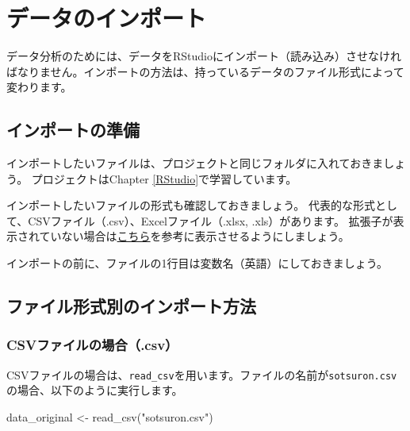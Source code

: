 \documentclass[
]{book}
\newenvironment{Shaded}{\begin{snugshade}}{\end{snugshade}}
\newcommand{\FunctionTok}[1]{\textcolor[rgb]{0.00,0.00,0.00}{#1}}
\newcommand{\NormalTok}[1]{#1}
\newcommand{\OtherTok}[1]{\textcolor[rgb]{0.56,0.35,0.01}{#1}}
\newcommand{\StringTok}[1]{\textcolor[rgb]{0.31,0.60,0.02}{#1}}
\begin{document}
\hypertarget{ImportData}{%
\chapter{データのインポート}\label{ImportData}}

データ分析のためには、データをRStudioにインポート（読み込み）させなければなりません。インポートの方法は、持っているデータのファイル形式によって変わります。

\hypertarget{ux30a4ux30f3ux30ddux30fcux30c8ux306eux6e96ux5099}{%
\section{インポートの準備}\label{ux30a4ux30f3ux30ddux30fcux30c8ux306eux6e96ux5099}}

インポートしたいファイルは、プロジェクトと同じフォルダに入れておきましょう。
プロジェクトはChapter \ref{RStudio}で学習しています。

インポートしたいファイルの形式も確認しておきましょう。
代表的な形式として、CSVファイル（.csv）、Excelファイル（.xlsx, .xls）があります。
拡張子が表示されていない場合は\href{https://pc-karuma.net/windows-10-show-explorer-file-name-extension/}{こちら}を参考に表示させるようにしましょう。

インポートの前に、ファイルの1行目は変数名（英語）にしておきましょう。

\hypertarget{ux30d5ux30a1ux30a4ux30ebux5f62ux5f0fux5225ux306eux30a4ux30f3ux30ddux30fcux30c8ux65b9ux6cd5}{%
\section{ファイル形式別のインポート方法}\label{ux30d5ux30a1ux30a4ux30ebux5f62ux5f0fux5225ux306eux30a4ux30f3ux30ddux30fcux30c8ux65b9ux6cd5}}

\hypertarget{csvux30d5ux30a1ux30a4ux30ebux306eux5834ux5408.csv}{%
\subsection{CSVファイルの場合（.csv）}\label{csvux30d5ux30a1ux30a4ux30ebux306eux5834ux5408.csv}}

CSVファイルの場合は、\texttt{read\_csv}を用います。ファイルの名前が\texttt{sotsuron.csv}の場合、以下のように実行します。

\begin{Shaded}
\begin{Highlighting}[]
\NormalTok{data\_original }\OtherTok{\textless{}{-}} \FunctionTok{read\_csv}\NormalTok{(}\StringTok{"sotsuron.csv"}\NormalTok{)}
\end{Highlighting}
\end{Shaded}
\end{document}
